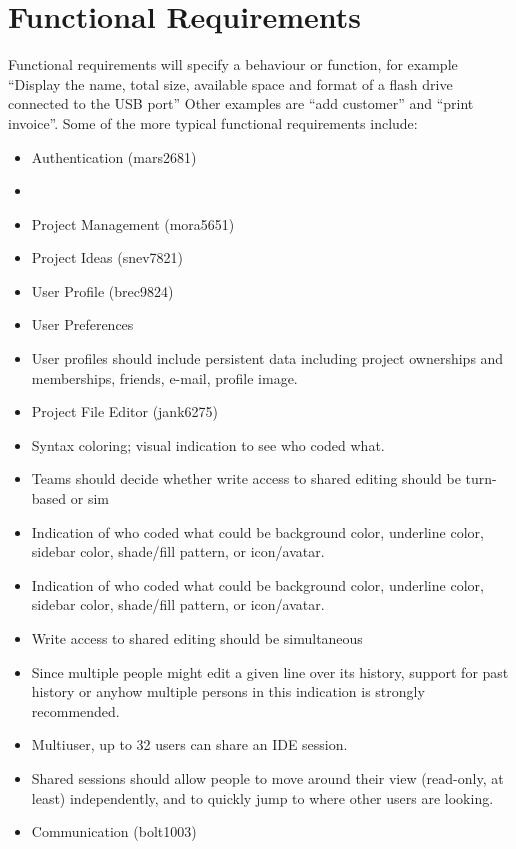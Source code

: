 \documentclass[11pt]{report}
\begin{document}
\section{Functional Requirements}
    Functional requirements will specify a behaviour or function, for example ``Display the name, total size, available space and format of a flash drive connected to the USB port'' Other examples are ``add customer'' and ``print invoice''. Some of the more typical functional requirements include:
    \begin{itemize}
        \item Authentication (mars2681)
            \item 
        \item Project Management (mora5651)
        \item Project Ideas (snev7821)
        \item User Profile (brec9824)
            \item User Preferences
            \item User profiles should include persistent data including project ownerships and  memberships, friends, e-mail, profile image.
        \item Project File Editor (jank6275)
            \item Syntax coloring; visual indication to see who coded what. 
            \item Teams should decide whether write access to shared editing should be turn-based or sim
            \item Indication of who coded what could be background color, underline color, sidebar color, shade/fill pattern, or icon/avatar. 
            \item Indication of who coded what could be background color, underline color, sidebar color, shade/fill pattern, or icon/avatar. 
            \item Write access to shared editing should be simultaneous
            \item Since multiple people might edit a given line over its history, support for past history or anyhow multiple persons in this indication is strongly recommended.    
            \item Multiuser, up to 32 users can share an IDE session.
            \item Shared sessions should allow people to move around their view (read-only, at least) independently, and to quickly jump to where other users are looking.
        \item Communication (bolt1003)

\end{itemize}
\end{document}
